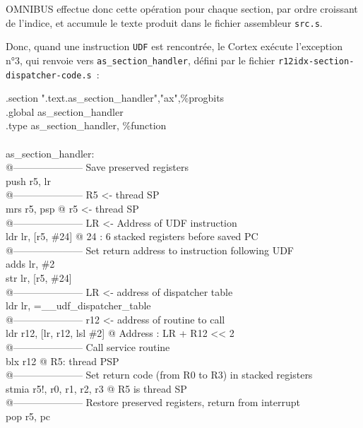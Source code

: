 OMNIBUS effectue donc cette opération pour chaque section, par ordre croissant de l'indice, et accumule le texte produit dans le fichier assembleur \texttt{src.s}.

Donc, quand une instruction \texttt{UDF} est rencontrée, le Cortex exécute l'exception n°3, qui renvoie vers \texttt{as\_section\_handler}, défini par le fichier \texttt{r12idx-section-dispatcher-code.s}~:

\begin{SHELL}\small
\hspace*{1.2em}.section	".text.as\_section\_handler","ax",\%progbits\\
\hspace*{1.2em}.global as\_section\_handler\\
\hspace*{1.2em}.type as\_section\_handler, \%function\\
\\
as\_section\_handler:\\
@--------------------- Save preserved registers\\
\hspace*{1.2em}push  {r5, lr}\\
@--------------------- R5 <- thread SP\\
\hspace*{1.2em}mrs   r5, psp           @ r5 <- thread SP\\
@--------------------- LR <- Address of UDF instruction\\
\hspace*{1.2em}ldr   lr, [r5, \#24]     @ 24 : 6 stacked registers before saved PC\\
@--------------------- Set return address to instruction following UDF\\
\hspace*{1.2em}adds  lr, \#2\\
\hspace*{1.2em}str   lr, [r5, \#24]\\
@--------------------- LR <- address of dispatcher table\\
\hspace*{1.2em}ldr   lr, =\_\_udf\_dispatcher\_table\\
@--------------------- r12 <- address of routine to call\\
\hspace*{1.2em}ldr   r12, [lr, r12, lsl \#2]   @ Address : LR + R12 << 2\\
@--------------------- Call service routine\\
\hspace*{1.2em}blx   r12                      @ R5: thread PSP\\
@--------------------- Set return code (from R0 to R3) in stacked registers\\
\hspace*{1.2em}stmia r5!, {r0, r1, r2, r3}    @ R5 is thread SP\\
@--------------------- Restore preserved registers, return from interrupt\\
\hspace*{1.2em}pop   {r5, pc}
\end{SHELL}

